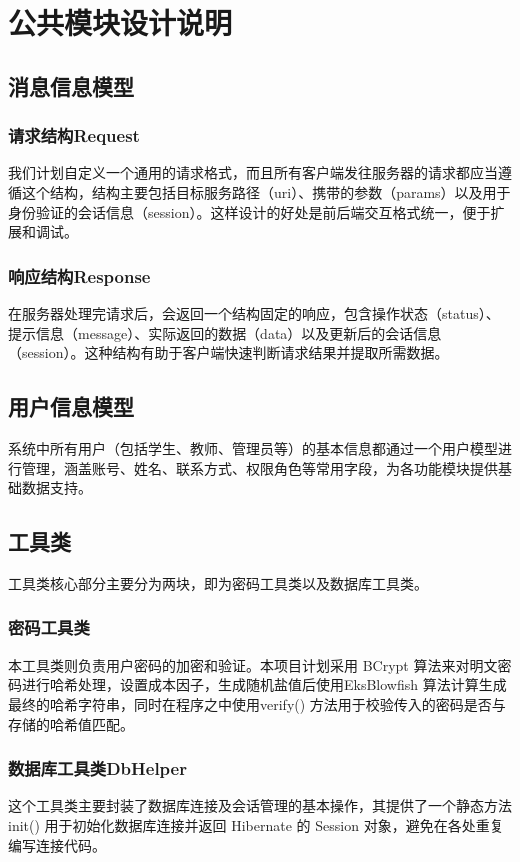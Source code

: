 \ifx\maindoc\undefined
{}
\fi

\section{公共模块设计说明}
\subsection{消息信息模型}
\subsubsection{请求结构Request}
我们计划自定义一个通用的请求格式，而且所有客户端发往服务器的请求都应当遵循这个结构，结构主要包括目标服务路径（uri）、携带的参数（params）以及用于身份验证的会话信息（session）。这样设计的好处是前后端交互格式统一，便于扩展和调试。
\subsubsection{响应结构Response}
在服务器处理完请求后，会返回一个结构固定的响应，包含操作状态（status）、提示信息（message）、实际返回的数据（data）以及更新后的会话信息（session）。这种结构有助于客户端快速判断请求结果并提取所需数据。
\subsection{用户信息模型}
系统中所有用户（包括学生、教师、管理员等）的基本信息都通过一个用户模型进行管理，涵盖账号、姓名、联系方式、权限角色等常用字段，为各功能模块提供基础数据支持。
\subsection{工具类}
工具类核心部分主要分为两块，即为密码工具类以及数据库工具类。
\subsubsection{密码工具类}
本工具类则负责用户密码的加密和验证。本项目计划采用  BCrypt 算法来对明文密码进行哈希处理，设置成本因子，生成随机盐值后使用EksBlowfish 算法计算生成最终的哈希字符串，同时在程序之中使用verify() 方法用于校验传入的密码是否与存储的哈希值匹配。
\subsubsection{数据库工具类DbHelper}
这个工具类主要封装了数据库连接及会话管理的基本操作，其提供了一个静态方法 init() 用于初始化数据库连接并返回 Hibernate 的 Session 对象，避免在各处重复编写连接代码。
